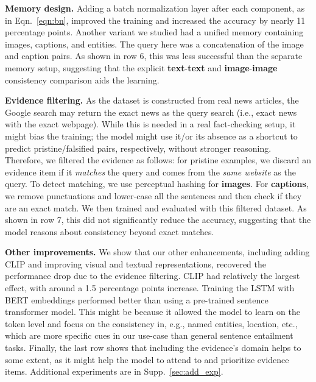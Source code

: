 \textbf{Memory design.} Adding a batch normalization layer after each component, as in Eqn.~\ref{eqn:bn}, improved the training and increased the accuracy by nearly 11 percentage points. Another variant we studied had a unified memory containing images, captions, and entities. The query here was a concatenation of the image and caption pairs. As shown in row 6, this was less successful than the separate memory setup, suggesting that the explicit \textbf{\textcolor{myblue}{text}}-\textbf{\textcolor{myblue}{text}} and \textbf{\textcolor{myOrange}{image}}-\textbf{\textcolor{myOrange}{image}} consistency comparison aids the learning. 

\textbf{Evidence filtering.} As the dataset is constructed from real news articles, the Google search may return the exact news as the query search (i.e., exact news with the exact webpage). While this is needed in a real fact-checking setup, it might bias the training; the model might use it/or its absence as a shortcut to predict pristine/falsified pairs, respectively, without stronger reasoning. Therefore, we filtered the evidence as follows: for pristine examples, we discard an evidence item if it \textit{matches} the query and comes from the \textit{same website} as the query. To detect matching, we use perceptual hashing for \textbf{\textcolor{myOrange}{images}}. For \textbf{\textcolor{myblue}{captions}}, we remove punctuations and lower-case all the sentences and then check if they are an exact match. We then trained and evaluated with this filtered dataset. As shown in row 7, this did not significantly reduce the accuracy, suggesting that the model reasons about consistency beyond exact matches.

\textbf{Other improvements.} We show that our other enhancements, including adding CLIP and improving visual and textual representations, recovered the performance drop due to the evidence filtering. CLIP had relatively the largest effect, with around a 1.5 percentage points increase. Training the LSTM with BERT embeddings performed better than using a pre-trained sentence transformer model. This might be because it allowed the model to learn on the token level and focus on the consistency in, e.g., named entities, location, etc., which are more specific cues in our use-case than general sentence entailment tasks. Finally, the last row shows that including the evidence's domain 
helps to some extent, as it might help the model to attend to and prioritize evidence items. Additional experiments are in Supp.~\ref{sec:add_exp}.

